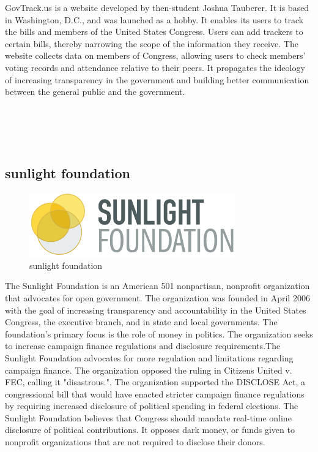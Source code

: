 \documentclass[conference]{IEEEtran}
\begin{document}
GovTrack.us is a website developed by then-student Joshua Tauberer. It is based in Washington, D.C., and was launched as a hobby. It enables its users to track the bills and members of the United States Congress. Users can add trackers to certain bills, thereby narrowing the scope of the information they receive. The website collects data on members of Congress, allowing users to check members' voting records and attendance relative to their peers. It propagates the ideology of increasing transparency in the government and building better communication between the general public and the government.
\\
\\
\\
\\
\\
 
\subsection{sunlight foundation}
  \begin{figure}[htbp]
    \centerline{\includegraphics[width=89mm, scale=0.5]{fig/sunlight_foundation.png}}
    \caption{sunlight foundation}
    \label{fig}
    \end{figure}
The Sunlight Foundation is an American 501 nonpartisan, nonprofit organization that advocates for open government. The organization was founded in April 2006 with the goal of increasing transparency and accountability in the United States Congress, the executive branch, and in state and local governments. The foundation's primary focus is the role of money in politics. The organization seeks to increase campaign finance regulations and disclosure requirements.The Sunlight Foundation advocates for more regulation and limitations regarding campaign finance. The organization opposed the ruling in Citizens United v. FEC, calling it "disastrous.". The organization supported the DISCLOSE Act, a congressional bill that would have enacted stricter campaign finance regulations by requiring increased disclosure of political spending in federal elections. The Sunlight Foundation believes that Congress should mandate real-time online disclosure of political contributions. It opposes dark money, or funds given to nonprofit organizations that are not required to disclose their donors.
\\
\\
\\
\\
\\
\\
\\
\\
 
\end{document}
